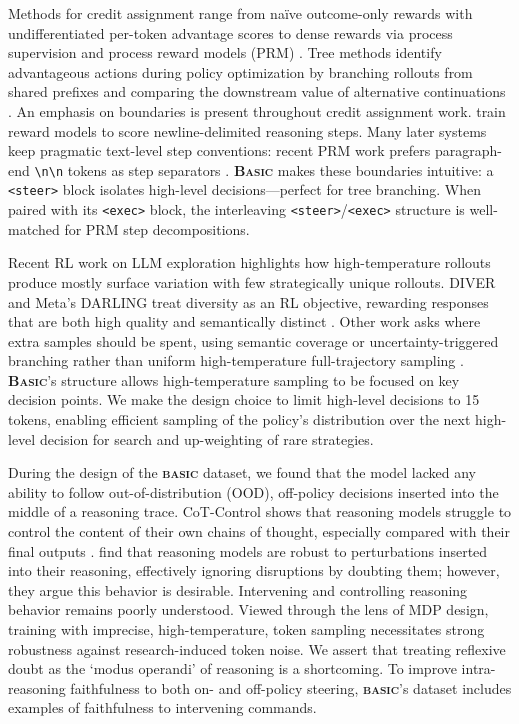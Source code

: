 \documentclass[10pt,twocolumn]{article}
\newcommand{\methodnamestart}{\textbf{\textsf{\textsc{Basic}}}}
\newcommand{\methodname}{\textbf{\textsf{\textsc{basic}}}}
\newcommand{\methodnamestart}{{\sffamily\bfseries B{\fontsize{0.9em}{0.9em}\selectfont ASIC}}}
\newcommand{\methodname}{{\sffamily\bfseries{\fontsize{0.95em}{0.95em}\selectfont BASIC}}}
\begin{document}
Methods for credit assignment range from naïve outcome-only rewards with
undifferentiated per-token advantage scores to dense rewards via process supervision
and process reward models (PRM) \cite{uesato2022process,lightman2023verify}. Tree methods identify
advantageous actions during policy
optimization by branching rollouts from shared prefixes and comparing the downstream
value of alternative continuations \cite{treepo2025,treegrpo2025,tempo2025,treerl2025}.
An emphasis on boundaries is present throughout credit assignment work.
\citet{lightman2023verify} train reward models to score newline-delimited reasoning
steps. Many later systems keep pragmatic text-level step conventions: recent PRM work
prefers paragraph-end \verb|\n\n| tokens as step separators
\cite{zheng2025processbench,zhang2025prmlessons}. \methodnamestart{} makes these boundaries
intuitive: a \texttt{<steer>} block isolates high-level decisions---perfect
for tree branching. When paired with its \texttt{<exec>} block, the
interleaving
\texttt{<steer>}/\texttt{<exec>} structure is well-matched for
PRM step decompositions.

Recent RL work on LLM exploration highlights how high-temperature rollouts produce
mostly surface variation with few strategically unique rollouts. DIVER and Meta's
DARLING treat diversity as an RL objective, rewarding responses that are
both high quality and semantically distinct \cite{hu2025diver,li2025darling}. Other
work asks where extra samples should be spent, using semantic coverage or
uncertainty-triggered branching rather than uniform high-temperature full-trajectory
sampling \cite{ets2025,fr3e2025,arpo2025}. \methodnamestart{}'s structure
allows high-temperature sampling to be focused on key decision points. We make the
design choice to limit high-level decisions to 15 tokens, enabling efficient sampling
of the policy's distribution over the next high-level decision for search and
up-weighting of rare strategies.

During the design of the \methodname{} dataset, we found that the model
lacked any ability to follow out-of-distribution (OOD), off-policy decisions
inserted into the middle of a reasoning trace. CoT-Control shows that reasoning models
struggle to control the content of their own chains of thought, especially compared
with their final outputs \cite{chen2026controlcot}. \citeauthor{vonrecum2026cotrobust} find
that reasoning models are robust to perturbations inserted into their reasoning,
effectively ignoring disruptions by doubting them; however, they argue this behavior is
desirable. Intervening and controlling reasoning behavior remains poorly understood.
Viewed through the lens of MDP design, training with imprecise, high-temperature,
token sampling necessitates strong robustness against research-induced token noise.
We assert that treating reflexive doubt \cite{vonrecum2026cotrobust,muennighoff2025s1} as the `modus
operandi'
of reasoning is a shortcoming. To improve intra-reasoning faithfulness to
both on- and off-policy steering, \methodname{}'s dataset includes
examples of faithfulness to intervening commands.
\end{document}
